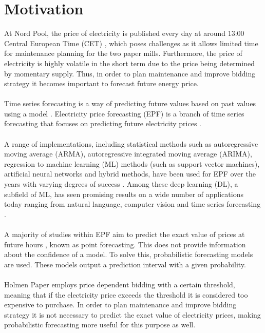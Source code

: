 \section{Motivation}
\label{sec:motivation}
At Nord Pool, the price of electricity is published every day at around 13:00 Central European Time (CET) \cite{NordPool2}, which poses challenges as it allows limited time for maintenance planning for the two paper mills. Furthermore, the price of electricity is highly volatile in the short term due to the price being determined by momentary supply. Thus, in order to plan maintenance and improve bidding strategy it becomes important to forecast future energy price.
\\\\
Time series forecasting is a way of predicting future values based on past values using a model \cite{chatfield}. Electricity price forecasting (EPF) is a branch of time series forecasting that focuses on predicting future electricity prices \cite{dawn}.
\\\\
A range of implementations, including statistical methods such as autoregressive moving average (ARMA), autoregressive integrated moving average (ARIMA), regression to machine learning (ML) methods (such as support vector machines), artificial neural networks and hybrid methods, have been used for EPF over the years with varying degrees of success \cite{LAGO2021116983}. Among these deep learning (DL), a subfield of ML, has seen promising results on a wide number of applications today ranging from natural language, computer vision and time series forecasting \cite{Jedrzejewski_2022}.
\\\\
A majority of studies within EPF aim to predict the exact value of prices at future hours \cite{epfnpool}, known as point forecasting. This does not provide information about the confidence of a model. To solve this, probabilistic forecasting models are used. These models output a prediction interval with a given probability. 
\\\\
Holmen Paper employs price dependent bidding with a certain threshold, meaning that if the electricity price exceeds the threshold it is considered too expensive to purchase. In order to plan maintenance and improve bidding strategy it is not necessary to predict the exact value of electricity prices, making probabilistic forecasting more useful for this purpose as well. 
